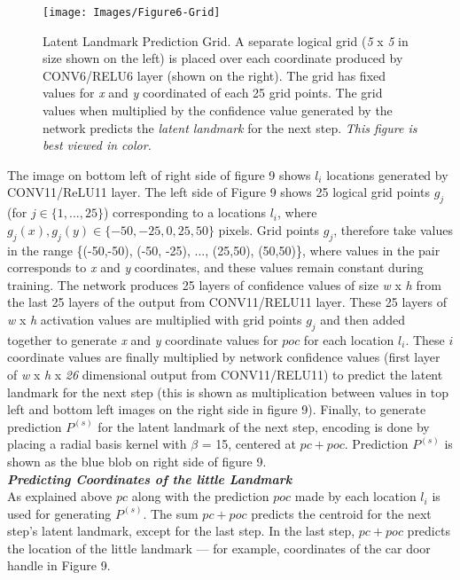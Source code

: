 \documentclass [11pt,letterpaper ,twoside ,openany ]{report}
\begin{document}
    \begin{figure}[t]
      \centering
      \texttt{[image: Images/Figure6-Grid]}
      \caption{Latent Landmark Prediction Grid. A separate logical grid (\textit{5} x \textit{5} in size shown on the left) is placed over each coordinate produced by CONV6/RELU6 layer (shown on the right). The grid has fixed values for \textit{x} and \textit{y} coordinated of each 25 grid points. The grid values when multiplied by the confidence value generated by the network predicts the \textit{latent landmark} for the next step. \textit{This figure is best viewed in color.}}
      \label{fig:grid}
    \end{figure}

    The image on bottom left of right side of figure 9 shows \(l_i\) locations generated by CONV11/ReLU11 layer. The left side of Figure 9 shows 25 logical grid points \(g_j\) (for \(j \in \{ 1,...,25 \} \)) corresponding to a locations \(l_i\), where \(g_j(x), g_j(y) \in \{-50, -25, 0, 25, 50\} \) pixels. Grid points \(g_j\), therefore take values in the range \{(-50,-50), (-50, -25), ..., (25,50), (50,50)\}, where values in the pair corresponds to \textit{x} and \textit{y} coordinates, and these values remain constant during training. The network produces 25 layers of confidence values of size \textit {w} x \textit {h} from the last 25 layers of the output from CONV11/RELU11 layer. These 25 layers of \textit {w} x \textit {h} activation values are multiplied with grid points \(g_j\) and then added together to generate \textit{x} and \textit{y} coordinate values for \( poc \) for each location \(l_i\). These \(i\) coordinate values are finally multiplied by network confidence values (first layer of \textit {w} x \textit {h} x \textit {26} dimensional output from CONV11/RELU11) to predict the latent landmark for the next step (this is shown as multiplication between values in top left and bottom left images on the right side in figure 9).  Finally, to generate prediction \(P^{(s)} \) for the latent landmark of the next step, encoding is done by placing a radial basis kernel with \(\beta \) = 15, centered at \( pc + poc \). Prediction \(P^{(s)} \) is shown as the blue blob on right side of figure 9.\\

    \noindent
    \textbf{\textit{Predicting Coordinates of the little Landmark}}\\
    As explained above \(pc \) along with the prediction \(poc\) made by each location \(l_i\) is used for generating \(P^{(s)}\). The sum \(pc + poc\) predicts the centroid for the next step's latent landmark, except for the last step. In the last step, \(pc + poc\) predicts the location of the little landmark --- for example, coordinates of the car door handle in Figure 9.\\\\
\end{document}
